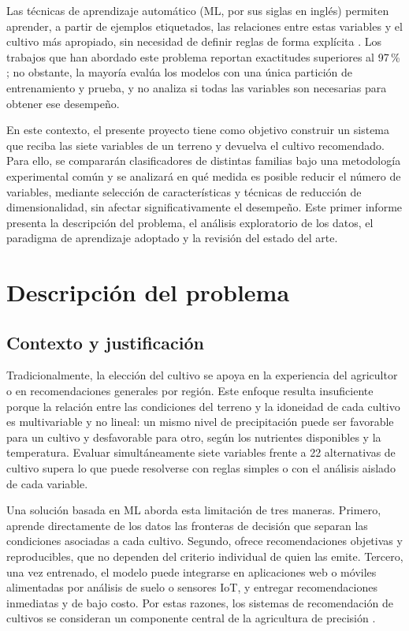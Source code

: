 \documentclass[conference]{IEEEtran}
\begin{document}
Las técnicas de aprendizaje automático (ML, por sus siglas en inglés) permiten aprender, a partir de ejemplos etiquetados, las relaciones entre estas variables y el cultivo más apropiado, sin necesidad de definir reglas de forma explícita \cite{bishop2006}. Los trabajos que han abordado este problema reportan exactitudes superiores al 97\,\% \cite{thilakarathne2022,prity2024,alam2025}; no obstante, la mayoría evalúa los modelos con una única partición de entrenamiento y prueba, y no analiza si todas las variables son necesarias para obtener ese desempeño.

En este contexto, el presente proyecto tiene como objetivo construir un sistema que reciba las siete variables de un terreno y devuelva el cultivo recomendado. Para ello, se compararán clasificadores de distintas familias bajo una metodología experimental común y se analizará en qué medida es posible reducir el número de variables, mediante selección de características y técnicas de reducción de dimensionalidad, sin afectar significativamente el desempeño. Este primer informe presenta la descripción del problema, el análisis exploratorio de los datos, el paradigma de aprendizaje adoptado y la revisión del estado del arte.

\section{Descripción del problema}

\subsection{Contexto y justificación}

Tradicionalmente, la elección del cultivo se apoya en la experiencia del agricultor o en recomendaciones generales por región. Este enfoque resulta insuficiente porque la relación entre las condiciones del terreno y la idoneidad de cada cultivo es multivariable y no lineal: un mismo nivel de precipitación puede ser favorable para un cultivo y desfavorable para otro, según los nutrientes disponibles y la temperatura. Evaluar simultáneamente siete variables frente a 22 alternativas de cultivo supera lo que puede resolverse con reglas simples o con el análisis aislado de cada variable.

Una solución basada en ML aborda esta limitación de tres maneras. Primero, aprende directamente de los datos las fronteras de decisión que separan las condiciones asociadas a cada cultivo. Segundo, ofrece recomendaciones objetivas y reproducibles, que no dependen del criterio individual de quien las emite. Tercero, una vez entrenado, el modelo puede integrarse en aplicaciones web o móviles alimentadas por análisis de suelo o sensores IoT, y entregar recomendaciones inmediatas y de bajo costo. Por estas razones, los sistemas de recomendación de cultivos se consideran un componente central de la agricultura de precisión \cite{thilakarathne2022,shastri2025}.
\end{document}

